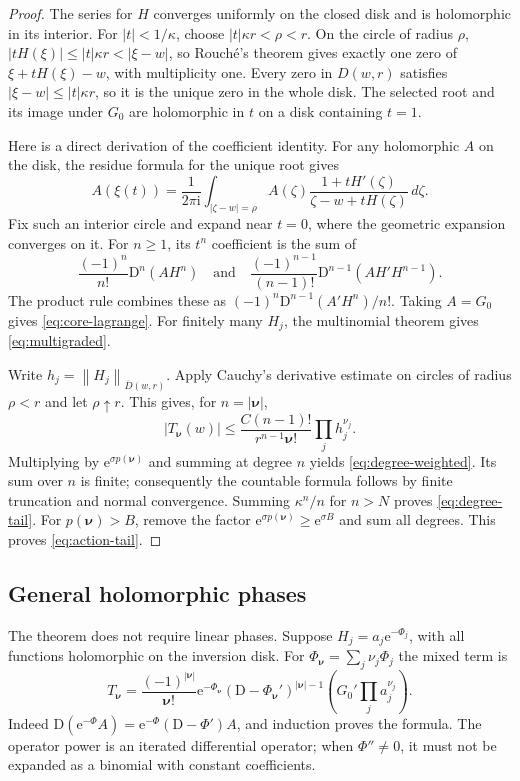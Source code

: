 \documentclass[11pt,a4paper]{article}
\numberwithin{equation}{section}
\theoremstyle{definition}
\theoremstyle{remark}
\newcommand{\D}{\mathrm D}
\newcommand{\ii}{\mathrm i}
\newcommand{\e}{\mathrm e}
\newcommand{\norm}[1]{\left\|#1\right\|}
\newcommand{\nn}{\boldsymbol\nu}
\begin{document}
\begin{proof}
The series for $H$ converges uniformly on the closed disk and is
holomorphic in its interior. For $|t|<1/\kappa$, choose
$|t|\kappa r<\rho<r$. On the circle of radius $\rho$,
$|tH(\xi)|\le |t|\kappa r<|\xi-w|$, so Rouch\'e's theorem
gives exactly one zero of $\xi+tH(\xi)-w$, with multiplicity one.
Every zero in $D(w,r)$ satisfies $|\xi-w|\le |t|\kappa r$,
so it is the unique zero in the whole disk.
The selected root and its image under $G_0$ are holomorphic in $t$
on a disk containing $t=1$.

Here is a direct derivation of the coefficient identity. For any holomorphic
$A$ on the disk, the residue formula for the unique root gives
\[
 A(\xi(t))=\frac1{2\pi\ii}\int_{|\zeta-w|=\rho}
 A(\zeta)\frac{1+tH'(\zeta)}{\zeta-w+tH(\zeta)}\,d\zeta.
\]
Fix such an interior circle and expand near $t=0$, where the
geometric expansion converges on it. For $n\ge1$, its $t^n$ coefficient
is the sum of
\[
 \frac{(-1)^n}{n!}\D^n(AH^n)
 \quad\text{and}\quad
 \frac{(-1)^{n-1}}{(n-1)!}\D^{n-1}(AH'H^{n-1}).
\]
The product rule combines these as
$(-1)^n\D^{n-1}(A'H^n)/n!$. Taking $A=G_0$ gives
\eqref{eq:core-lagrange}. For finitely many $H_j$, the multinomial theorem
gives \eqref{eq:multigraded}.

Write $h_j=\norm{H_j}_{\overline D(w,r)}$. Apply Cauchy's
derivative estimate on circles of radius $\rho<r$ and let
$\rho\uparrow r$. This gives, for $n=|\nn|$,
\[
 |T_{\nn}(w)|\le
 \frac{C(n-1)!}{r^{n-1}\nn!}\prod_j h_j^{\nu_j}.
\]
Multiplying by $\e^{\sigma p(\nn)}$ and summing at degree $n$ yields
\eqref{eq:degree-weighted}. Its sum over $n$ is finite; consequently the
countable formula follows by finite truncation and normal convergence.
Summing $\kappa^n/n$ for $n>N$ proves \eqref{eq:degree-tail}.
For $p(\nn)>B$, remove the factor
$\e^{\sigma p(\nn)}\ge\e^{\sigma B}$ and sum all degrees. This proves
\eqref{eq:action-tail}.
\end{proof}

\subsection{General holomorphic phases}

The theorem does not require linear phases. Suppose
$H_j=a_j\e^{-\Phi_j}$, with all functions holomorphic on the inversion disk.
For $\Phi_{\nn}=\sum_j\nu_j\Phi_j$ the mixed term is
\begin{equation}\label{eq:gauge-coefficients}
 T_{\nn}=\frac{(-1)^{|\nn|}}{\nn!}\e^{-\Phi_{\nn}}
 (\D-\Phi_{\nn}')^{|\nn|-1}
 \left(G_0'\prod_j a_j^{\nu_j}\right).
\end{equation}
Indeed $\D(\e^{-\Phi}A)=\e^{-\Phi}(\D-\Phi')A$, and induction proves
the formula. The operator power is an iterated differential operator;
when $\Phi''\ne0$, it must not be expanded as a binomial with constant
coefficients.
\end{document}
